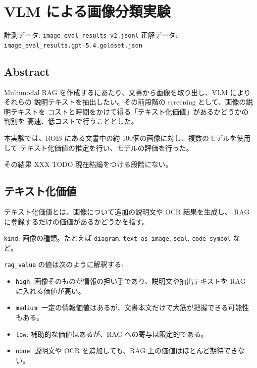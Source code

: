\documentclass[
]{article}
\author{}
\date{}
\newcounter{none} %
\providecommand{\tightlist}{%
  \setlength{\itemsep}{0pt}\setlength{\parskip}{0pt}}
\begin{document}
\section{VLM
による画像分類実験}\label{vlm-ux306bux3088ux308bux753bux50cfux5206ux985eux5b9fux9a13}

計測データ: \texttt{image\_eval\_results\_v2.jsonl} 正解データ:
\texttt{image\_eval\_results.gpt-5.4.goldset.json}

\subsection{Abstract}\label{abstract}

Multimodal RAG を作成するにあたり、文書から画像を取り出し、VLM
によりそれらの 説明テキストを抽出したい。その前段階の screening
として、画像の説明テキストを
コストと時間をかけて得る「テキスト化価値」があるかどうかの判別を
高速、低コストで行うこととした。

本実験では、ROIS にある文書中の約
100個の画像に対し、複数のモデルを使用して
テキスト化価値の推定を行い、モデルの評価を行った。

その結果 XXX TODO 現在結論をつける段階にない。

\subsection{テキスト化価値}\label{ux30c6ux30adux30b9ux30c8ux5316ux4fa1ux5024}

テキスト化価値とは、画像について追加の説明文や OCR 結果を生成し、 RAG
に登録するだけの価値があるかどうかを指す。

\texttt{kind}: 画像の種類。たとえば \texttt{diagram},
\texttt{text\_as\_image}, \texttt{seal}, \texttt{code\_symbol} など。

\texttt{rag\_value} の値は次のように解釈する:

\begin{itemize}
\tightlist
\item
  \texttt{high}:
  画像そのものが情報の担い手であり、説明文や抽出テキストを RAG
  に入れる価値が高い。
\item
  \texttt{medium}:
  一定の情報価値はあるが、文書本文だけで大筋が把握できる可能性もある。
\item
  \texttt{low}: 補助的な価値はあるが、RAG への寄与は限定的である。
\item
  \texttt{none}: 説明文や OCR を追加しても、RAG
  上の価値はほとんど期待できない。
\end{itemize}
\end{document}

